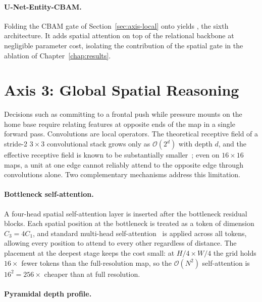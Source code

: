 \vspace*{-0.5cm}

\paragraph{U-Net-Entity-CBAM.}
Folding the CBAM gate of Section~\ref{sec:axis-local} onto  yields , the sixth architecture. It adds spatial attention on top of the relational backbone at negligible parameter cost, isolating the contribution of the spatial gate in the ablation of Chapter~\ref{chap:results}.

\section{Axis 3: Global Spatial Reasoning}
\label{sec:axis-global}

Decisions such as committing to a frontal push while pressure mounts on the home base require relating features at opposite ends of the map in a single forward pass. Convolutions are local operators. The theoretical receptive field of a stride-2 $3{\times}3$ convolutional stack grows only as $\mathcal{O}(2^d)$ with depth $d$, and the effective receptive field is known to be substantially smaller~\cite{luoUnderstandingEffectiveReceptive2017}; even on $16{\times}16$ maps, a unit at one edge cannot reliably attend to the opposite edge through convolutions alone. Two complementary mechanisms address this limitation.

\paragraph{Bottleneck self-attention.}
A four-head spatial self-attention layer is inserted after the bottleneck residual blocks. Each spatial position at the bottleneck is treated as a token of dimension $C_3 = 4 C_1$, and standard multi-head self-attention~\cite{vaswaniAttentionAllYou2017} is applied across all tokens, allowing every position to attend to every other regardless of distance. The placement at the deepest stage keeps the cost small: at $H/4 \times W/4$ the grid holds $16\times$ fewer tokens than the full-resolution map, so the $\mathcal{O}(N^2)$ self-attention is $16^2 = 256\times$ cheaper than at full resolution.

\paragraph{Pyramidal depth profile.}

